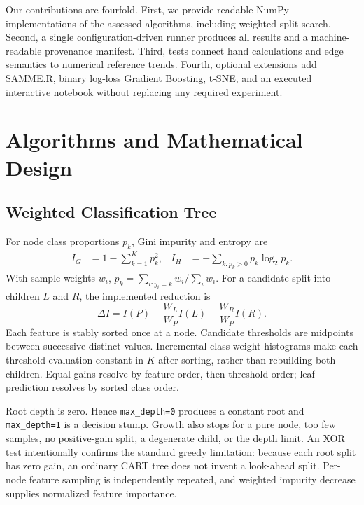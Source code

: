 \documentclass[conference]{IEEEtran}
\begin{document}
Our contributions are fourfold. First, we provide readable NumPy
implementations of the assessed algorithms, including weighted split search.
Second, a single configuration-driven runner produces all results and a
machine-readable provenance manifest. Third, tests connect hand calculations
and edge semantics to numerical reference trends. Fourth, optional extensions
add SAMME.R, binary log-loss Gradient Boosting, t-SNE, and an executed
interactive notebook without replacing any required experiment.

\section{Algorithms and Mathematical Design}

\subsection{Weighted Classification Tree}
For node class proportions $p_k$, Gini impurity and entropy are
\begin{align}
I_G &= 1-\sum_{k=1}^{K}p_k^2, &
I_H &= -\sum_{k:p_k>0}p_k\log_2 p_k. \label{eq:impurity}
\end{align}
With sample weights $w_i$, $p_k=\sum_{i:y_i=k}w_i/\sum_i w_i$. For a candidate
split into children $L$ and $R$, the implemented reduction is
\begin{equation}
\Delta I=I(P)-\frac{W_L}{W_P}I(L)-\frac{W_R}{W_P}I(R). \label{eq:gain}
\end{equation}
Each feature is stably sorted once at a node. Candidate thresholds are
midpoints between successive distinct values. Incremental class-weight
histograms make each threshold evaluation constant in $K$ after sorting,
rather than rebuilding both children. Equal gains resolve by feature order,
then threshold order; leaf prediction resolves by sorted class order.

Root depth is zero. Hence \texttt{max\_depth=0} produces a constant root and
\texttt{max\_depth=1} is a decision stump. Growth also stops for a pure node,
too few samples, no positive-gain split, a degenerate child, or the depth
limit. An XOR test intentionally confirms the standard greedy limitation:
because each root split has zero gain, an ordinary CART tree does not invent a
look-ahead split. Per-node feature sampling is independently repeated, and
weighted impurity decrease supplies normalized feature importance.
\end{document}
